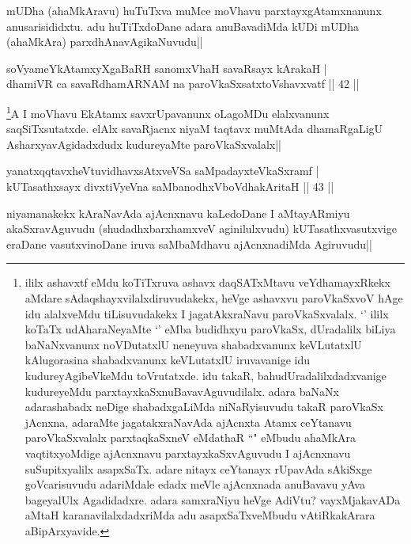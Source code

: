 \begin{artha}
mUDha (ahaMkAravu) huTuTxva muMce moVhavu parxtayxgAtamxnanunx anusarisididxtu. adu huTiTxdoDane adara anuBavadiMda kUDi mUDha (ahaMkAra) parxdhAnavAgikaNuvudu||
\end{artha}

\begin{shl}
soV\s yameYkAtamxyXgaBaRH sanomxVhaH savaRsayx kArakaH |\\
dhamiVR ca savaRdhamARNAM na paroVkaSxsatxtoV\s shavxvatf \hfill || 42 ||
\end{shl}

\begin{artha}
\footnote[1]{ililx ashavxtf eMdu koTiTxruva ashavx daqSATxMtavu veYdhamayxRkekx aMdare sAdaqshayxvilalxdiruvudakekx, heVge ashavxvu paroVkaSxvoV hAge idu alalxveMdu tiLisuvudakekx I jagatAkxraNavu paroVkaSxvalalx. `\stext ' ililx koTaTx udAharaNeyaMte `\stext ' eMba budidhxyu paroVkaSx, dUradalilx biLiya baNaNxvanunx noVDutatxlU neneyuva shabadxvanunx keVLutatxlU kAlugorasina shabadxvanunx keVLutatxlU iruvavanige idu kudureyAgibeVkeMdu toVrutatxde. idu takaR, bahudUradalilxdadxvanige kudureyeMdu parxtayxkaSxnuBavavAguvudilalx. adara baNaNx adarashabadx neDige shabadxgaLiMda niNaRyisuvudu takaR paroVkaSx jAcnxna, adaraMte jagatakxraNavAda ajAcnxta Atamx ceYtanavu paroVkaSxvalalx parxtaqkaSxneV eMdathaR ``\stext " eMbudu ahaMkAra vaqtitxyoMdige ajAcnxnavu parxtayxkaSxvAguvudu I ajAcnxnavu suSupitxyalilx asapxSaTx. adare nitayx ceYtanayx rUpavAda sAkiSxge goVcarisuvudu adariMdale edadx meVle \stext ajAcnxnada anuBavavu yAva bageyalUlx Agadidadxre. adara samxraNiyu heVge AdiVtu? vayxMjakavADa aMtaH karanavilalxdadxriMda adu asapxSaTxveMbudu vAtiRkakArara aBipArxyavide.}A I moVhavu EkAtamx savxrUpavanunx oLagoMDu elalxvanunx saqSiTxsutatxde. elAlx savaRjacnx niyaM taqtavx muMtAda dhamaRgaLigU AsharxyavAgidadxdudx kudureyaMte paroVkaSxvalalx||
\end{artha}

\begin{shl}
yanatxqqtavxheVtuvidhavxsAtxveVSa saMpadayxteV\s kaSxramf |\\
kUTasathxsayx divxtiVyeVna saMbanodhxV\s boVdhakAritaH \hfill || 43 ||
\end{shl}

\begin{artha}%
niyamanakekx kAraNavAda ajAcnxnavu kaLedoDane I aMtayARmiyu akaSxravAguvudu (shudadhxbarxhamxveV aginilulxvudu) kUTasathxvasutxvige eraDane vasutxvinoDane iruva saMbaMdhavu ajAcnxnadiMda Agiruvudu||
\end{artha}


